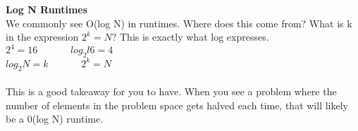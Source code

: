 \documentclass[14pt, noindent]{article}
\begin{document}
\textbf{Log N Runtimes}\\
We commonly see O(log N) in runtimes. Where does this come from?
What is k in the expression $2^k = N$? This is exactly what log expresses.\\
$2^4 = 16       \hspace{40pt}          log_2l6 = 4$\\
$log_2N = k     \hspace{40pt}          2^k = N      $\\\\
This is a good takeaway for you to have. When you see a problem where the number of elements
in the problem space gets halved each time, that will likely be a 0(log N) runtime.
\end{document}
